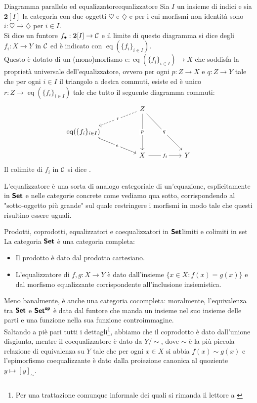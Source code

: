 \documentclass[openany]{book}
\renewcommand\C{\mc{C}}
\newcommand\eq{\operatorname{eq}}
\begin{document}
\begin{definition}{Diagramma parallelo ed equalizzatore}{equalizzatore}
    Sia $I$ un insieme di indici e sia $\mathbf{2}[I]$ la categoria con due oggetti $\heartsuit$ e $\diamondsuit$ e per i cui morfismi non identità sono $i:\heartsuit \to \diamondsuit$ per $i \in I$.\\
    Si dice  un funtore $f_\bullet : \mathbf{2}[I]\to \C$ e il limite di questo diagramma si dice  degli $f_i : X\to Y$ in $\C$ ed è indicato con $\eq(\{f_i\}_{i \in I})$.\\
    Questo è dotato di un (mono)morfismo $e: \eq(\{f_i\}_{i \in I})\to X$ che soddisfa la proprietà universale dell'equalizzatore, ovvero per ogni $p:Z\to X$ e $q:Z\to Y$ tale che per ogni $i \in I$ il triangolo a destra commuti, esiste ed è unico $r:Z\to \eq(\{f_i\}_{i \in I})$ tale che tutto il seguente diagramma commuti:
    \[\begin{tikzcd}
    	&& Z && \\
	    {\eq(\{f_i\}_{i \in I})} \\
	    && X && Y
	    \arrow["r"{description}, dashed, from=1-3, to=2-1]
	    \arrow["p"{description}, from=1-3, to=3-3]
	    \arrow["q"{description}, from=1-3, to=3-5]
	    \arrow["e"{description}, hook, from=2-1, to=3-3]
	    \arrow["{f_i}"{description}, from=3-3, to=3-5]
    \end{tikzcd}\]
    Il colimite di $f_i$ in $\C$ si dice .
\end{definition}
 
L'equalizzatore è una sorta di analogo categoriale di un'equazione, esplicitamente in $\text{\sffamily\textbf{Set}}$ e nelle categorie concrete come vediamo qua sotto, corrispondendo al "sotto-oggetto più grande" sul quale restringere i morfismi in modo tale che questi risultino essere uguali.

\begin{example}{Prodotti, coprodotti, equalizzatori e coequalizzatori in $\text{\sffamily\textbf{Set}}$}{limiti e colimiti in set}
    La categoria $\text{\sffamily\textbf{Set}}$ è una categoria completa:
    \begin{itemize}
        \item Il prodotto è dato dal prodotto cartesiano.
        \item L'equalizzatore di $f,g:X\to Y$ è dato dall'insieme $\{ x \in X : f(x)=g(x) \}$ e dal morfismo equalizzante corrispondente all'inclusione insiemistica.
    \end{itemize}
    Meno banalmente, è anche una categoria cocompleta: moralmente, l'equivalenza tra $\text{\sffamily\textbf{Set}}$ e $\text{\sffamily\textbf{Set}}^{\text{\sffamily\textbf{op}}}$ è data dal funtore che manda un insieme nel suo insieme delle parti e una funzione nella sua funzione controimmagine.\\
    Saltando a piè pari tutti i dettagli\footnote{Per una trattazione comunque informale dei quali si rimanda il lettore a \cite{ButGeeee}}, abbiamo che il coprodotto è dato dall'unione disgiunta, mentre il coequalizzatore è dato da $Y/\sim$, dove $\sim$ è la più piccola relazione di equivalenza su $Y$ tale che per ogni $x \in X$ si abbia $f(x)\sim g(x)$ e l'epimorfismo coequalizzante è dato dalla proiezione canonica al quoziente $y\mapsto [y]_\sim$.
\end{example}
\end{document}
